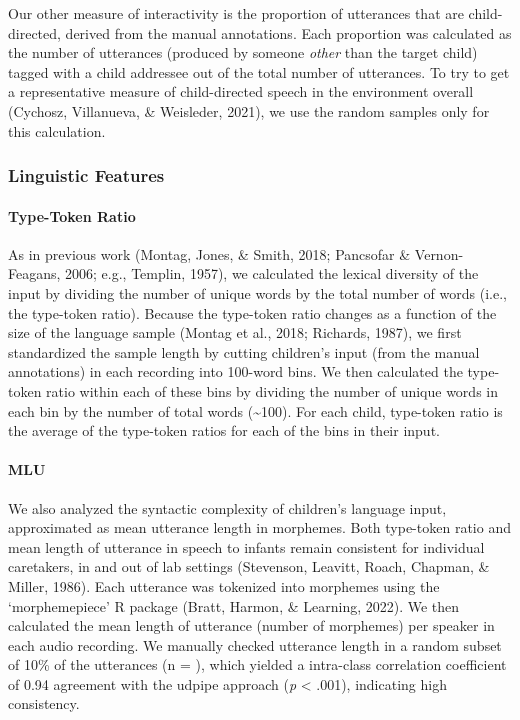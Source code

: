 \documentclass[
  man,floatsintext]{apa6}
\let\oldparagraph\paragraph
\renewcommand{\paragraph}[1]{\oldparagraph{#1}\mbox{}}
\begin{document}
Our other measure of interactivity is the proportion of utterances that are child-directed, derived from the manual annotations. Each proportion was calculated as the number of utterances (produced by someone \emph{other} than the target child) tagged with a child addressee out of the total number of utterances. To try to get a representative measure of child-directed speech in the environment overall (Cychosz, Villanueva, \& Weisleder, 2021), we use the random samples only for this calculation.

\hypertarget{linguistic-features}{%
\subsubsection{Linguistic Features}\label{linguistic-features}}

\hypertarget{type-token-ratio}{%
\paragraph{Type-Token Ratio}\label{type-token-ratio}}

As in previous work (Montag, Jones, \& Smith, 2018; Pancsofar \& Vernon-Feagans, 2006; e.g., Templin, 1957), we calculated the lexical diversity of the input by dividing the number of unique words by the total number of words (i.e., the type-token ratio). Because the type-token ratio changes as a function of the size of the language sample (Montag et al., 2018; Richards, 1987), we first standardized the sample length by cutting children's input (from the manual annotations) in each recording into 100-word bins. We then calculated the type-token ratio within each of these bins by dividing the number of unique words in each bin by the number of total words (\textasciitilde100). For each child, type-token ratio is the average of the type-token ratios for each of the bins in their input.

\hypertarget{mlu}{%
\paragraph{MLU}\label{mlu}}

We also analyzed the syntactic complexity of children's language input, approximated as mean utterance length in morphemes. Both type-token ratio and mean length of utterance in speech to infants remain consistent for individual caretakers, in and out of lab settings (Stevenson, Leavitt, Roach, Chapman, \& Miller, 1986). Each utterance was tokenized into morphemes using the `morphemepiece' R package (Bratt, Harmon, \& Learning, 2022). We then calculated the mean length of utterance (number of morphemes) per speaker in each audio recording. We manually checked utterance length in a random subset of 10\% of the utterances (n = ), which yielded a intra-class correlation coefficient of 0.94 agreement with the udpipe approach (\emph{p} \textless{} .001), indicating high consistency.
\end{document}
